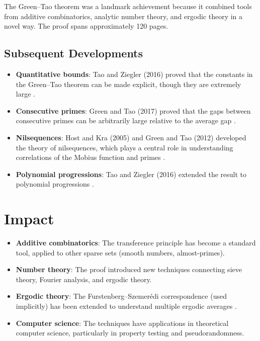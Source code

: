 \begin{highlightbox}
The Green--Tao theorem was a landmark achievement because it combined tools from additive combinatorics, analytic number theory, and ergodic theory in a novel way. The proof spans approximately 120 pages.
\end{highlightbox}

\subsection{Subsequent Developments}

\begin{itemize}
\item \textbf{Quantitative bounds}: Tao and Ziegler (2016) proved that the constants in the Green--Tao theorem can be made explicit, though they are extremely large \cite{tao2016}.
\item \textbf{Consecutive primes}: Green and Tao (2017) proved that the gaps between consecutive primes can be arbitrarily large relative to the average gap \cite{greentao2017}.
\item \textbf{Nilsequences}: Host and Kra (2005) and Green and Tao (2012) developed the theory of nilsequences, which plays a central role in understanding correlations of the Mobius function and primes \cite{host2005, greentao2012}.
\item \textbf{Polynomial progressions}: Tao and Ziegler (2016) extended the result to polynomial progressions \cite{tao2016}.
\end{itemize}

\section{Impact}

\begin{itemize}
\item \textbf{Additive combinatorics}: The transference principle has become a standard tool, applied to other sparse sets (smooth numbers, almost-primes).
\item \textbf{Number theory}: The proof introduced new techniques connecting sieve theory, Fourier analysis, and ergodic theory.
\item \textbf{Ergodic theory}: The Furstenberg--Szemer\'edi correspondence (used implicitly) has been extended to understand multiple ergodic averages \cite{furstenberg1977}.
\item \textbf{Computer science}: The techniques have applications in theoretical computer science, particularly in property testing and pseudorandomness.
\end{itemize}

